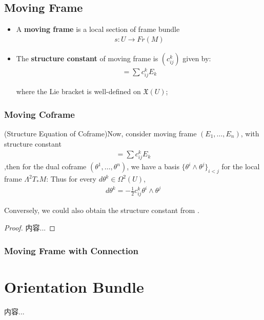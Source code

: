 \documentclass[Total.tex]{subfiles}
\begin{document}
			\subsection{Moving Frame}
				\begin{Def}
					\begin{itemize}
						\item 
						A \textbf{moving frame} is a local section of frame bundle
						\begin{gather*}
							s:U\rightarrow Fr(M)
						\end{gather*}
						\item The \textbf{structure constant} of moving frame is $(c_{ij}^k)$ given by:
						\begin{gather*}
							[E_i,E_j]=\sum c^k_{ij}E_k
						\end{gather*}
						
						where the Lie bracket is well-defined on $\mathfrak{X}(U)$;
					\end{itemize}
				\end{Def}
				\subsubsection{Moving Coframe}
				\begin{proposition}
					(Structure Equation of Coframe)Now, consider moving frame $(E_1,\dots,E_n)$, with structure constant
					\begin{gather*}
						[E_i,E_j]=\sum c_{ij}^kE_k
					\end{gather*} ,then for the dual coframe $(\theta^1,\dots,\theta^n)$, we have a basis $\{\theta^i\wedge \theta^j\}_{i<j}$ for the local frame $\Lambda^2 T_* M$: Thus for every $d\theta^k\in \Omega^2(U)$,
					\begin{gather*}
						d\theta^k=-\frac{1}{2}c_{ij}^k \theta^i\wedge \theta^j
					\end{gather*}
					
					Conversely, we could also obtain the structure constant from .
				\end{proposition}
				\begin{proof}
					内容...
				\end{proof}
				\subsubsection{Moving Frame with Connection}
		\section{Orientation Bundle}
			\begin{Def}
				内容...
			\end{Def}
\end{document}
